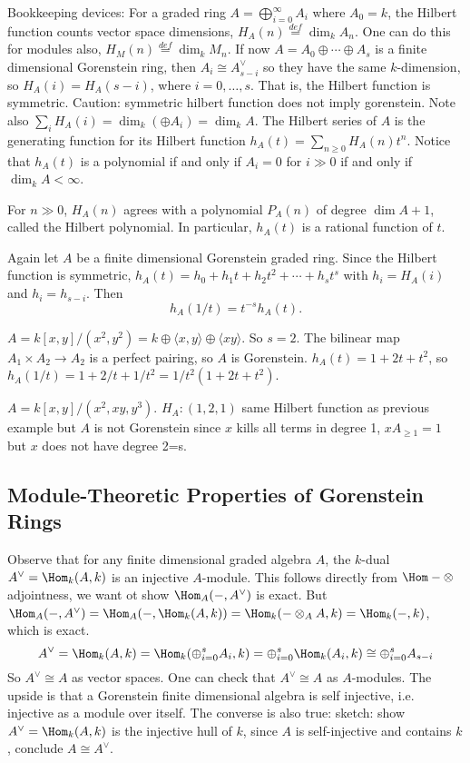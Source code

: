 Bookkeeping devices: For a graded ring $A= \bigoplus_{i=0}^\infty A_i$ where $A_0=k$, the Hilbert function counts vector space dimensions, $H_A(n) \stackrel{def}{=} \dim_k A_n$. One can do this for modules also, $H_M(n) \stackrel{def}{=} \dim_k M_n$. If now $A= A_0 \oplus \cdots \oplus A_s$ is a finite dimensional Gorenstein ring, then $A_i \cong A_{s-i}^\vee$ so they have the same $k$-dimension, so $H_A(i)= H_A(s-i)$, where $i=0,\ldots,s$. That is, the Hilbert function is symmetric. Caution: symmetric hilbert function does not imply gorenstein. Note also $\sum_i H_A(i)= \dim_k( \oplus A_i)= \dim_k A$. The Hilbert series of $A$ is the generating function for its Hilbert function $h_A(t)= \sum_{n \geq 0} H_A(n) t^n$. Notice that $h_A(t)$ is a polynomial if and only if $A_i=0$ for $i \gg 0$ if and only if $\dim_k A< \infty$. 


\begin{thm}[Hilbert]
For $n \gg 0$, $H_A(n)$ agrees with a polynomial $P_A(n)$ of degree $\dim A+1$, called the Hilbert polynomial. In particular, $h_A(t)$ is a rational function of $t$. 
\end{thm}


Again let $A$ be a finite dimensional Gorenstein graded ring. Since the Hilbert function is symmetric, $h_A(t)= h_0 + h_1t + h_2t^2+ \cdots + h_st^s$ with $h_i= H_A(i)$ and $h_i= h_{s-i}$. Then 
	\[
	h_A(1/t) = t^{-s} h_A(t).
	\]


\begin{ex}
$A= k[x,y]/(x^2,y^2)= k \oplus \langle x,y \rangle \oplus \langle xy \rangle$. So $s=2$. The bilinear map $A_1 \times A_2 \to A_2$ is a perfect pairing, so $A$ is Gorenstein. $h_A(t)= 1+2t+t^2$, so $h_A(1/t)= 1+2/t+1/t^2= 1/t^2(1+2t+t^2)$. 
\end{ex}


\begin{ex}
$A= k[x,y]/(x^2,xy,y^3)$. $H_A: (1,2,1)$ same Hilbert function as previous example but $A$ is not Gorenstein since $x$ kills all terms in degree 1, $xA_{\geq 1}= 1$ but $x$ does not have degree 2=s. 
\end{ex}



\subsection{Module-Theoretic Properties of Gorenstein Rings}

Observe that for any finite dimensional graded algebra $A$, the $k$-dual $A^\vee= \Hom_k(A,k)$ is an injective $A$-module. This follows directly from $\Hom - \otimes$ adjointness, we want ot show $\Hom_A(-,A^\vee)$ is exact. But $\Hom_A(-,A^\vee)= \Hom_A(-, \Hom_k(A,k))= \Hom_k(-\otimes_A A,k)= \Hom_k(-,k)$, which is exact. 
	\[
	A^\vee = \Hom_k(A,k) = \Hom_k( \oplus_{i=0}^s A_i,k) = \oplus_{i=0}^s \Hom_k(A_i,k) \cong \oplus_{i=0}^s A_{s-i}
	\]
So $A^\vee \cong A$ as vector spaces. One can check that $A^\vee \cong A$ as $A$-modules. The upside is that a Gorenstein finite dimensional algebra is self injective, i.e. injective as a module over itself. The converse is also true: sketch: show $A^\vee= \Hom_k(A,k)$ is the injective hull of $k$, since $A$ is self-injective and contains $k$, conclude $A \cong A^\vee$. 

